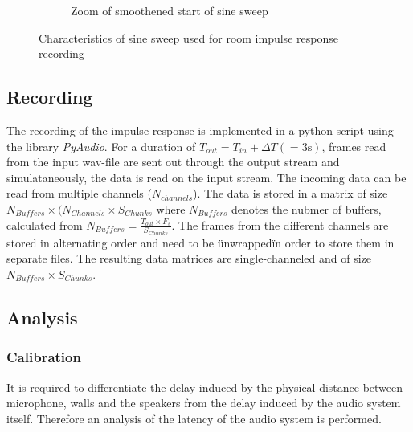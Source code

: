 \begin{figure}[H]
\begin{subfigure}[b]{0.49\linewidth}
        \caption{Zoom of smoothened start of sine sweep}
        \label{fig:sweep_start}
	\end{subfigure}
	\caption{Characteristics of sine sweep used for room impulse response recording} 
	\label{fig:sweep}
\end{figure}


\subsection{Recording}

The recording of the impulse response is implemented in a python script using the library \textit{PyAudio}. For a duration of $T_{out}=T_{in} + \Delta T (= 3\text{s})$, frames read from the input wav-file are sent out through the output stream and simulataneously, the data is read on the input stream. 
The incoming data can be read from multiple channels ($N_{channels}$). 
The data is stored in a matrix of size $N_{Buffers} \times (N_{Channels} \times  S_{Chunks}$ where $N_{Buffers}$ denotes the nubmer of buffers, calculated from $N_{Buffers} = \frac{T_{out} \times F_s}{S_{Chunks}}$.
The frames from the different channels are stored in alternating order and need to be \"unwrapped\" in order to store them in separate files. The resulting data matrices are single-channeled and of size $N_{Buffers} \times  S_{Chunks}$.

\subsection{Analysis}

\subsubsection{Calibration}
It is required to differentiate the delay induced by the physical distance between microphone, walls and the speakers from the delay induced by the audio system itself. Therefore an analysis of the latency of the audio system is performed. 

